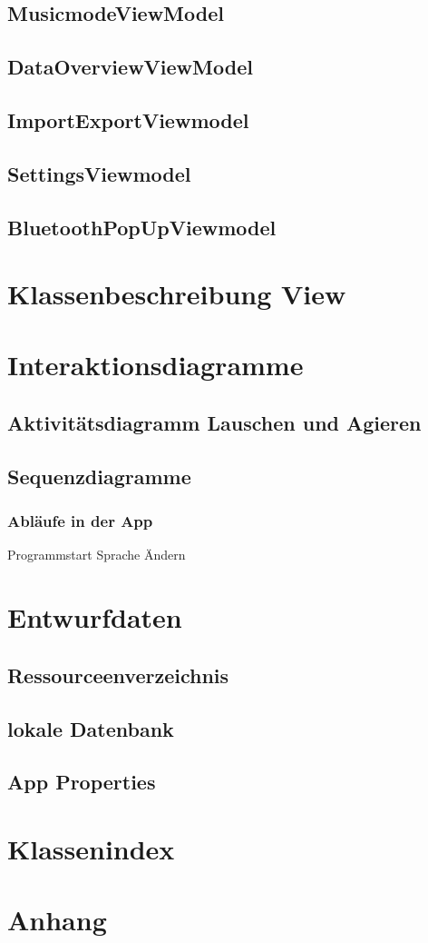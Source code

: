 \documentclass[a4paper,12pt]{article}
\begin{document}
\subsection{MusicmodeViewModel}

\subsection{DataOverviewViewModel}

\subsection{ImportExportViewmodel}

\subsection{SettingsViewmodel}

\subsection{BluetoothPopUpViewmodel}

\section{Klassenbeschreibung View}
\section{Interaktionsdiagramme}
\subsection{Aktivitätsdiagramm Lauschen und Agieren}
\subsection{Sequenzdiagramme}
\subsubsection{Abläufe in der App}
Programmstart
Sprache Ändern
\section{Entwurfdaten}
\subsection{Ressourceenverzeichnis}
\subsection{lokale Datenbank}
\subsection{App Properties}

\section{Klassenindex}
\section{Anhang}

\clearpage
\printglossaries
{}
\end{document}
